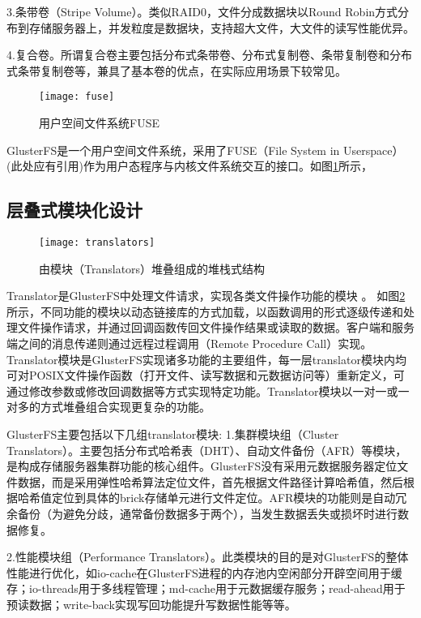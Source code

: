 3.条带卷（Stripe Volume）。类似RAID0，文件分成数据块以Round Robin方式分布到存储服务器上，并发粒度是数据块，支持超大文件，大文件的读写性能优异。

4.复合卷。所谓复合卷主要包括分布式条带卷、分布式复制卷、条带复制卷和分布式条带复制卷等，兼具了基本卷的优点，在实际应用场景下较常见。

\begin{figure}[htp]
\centering
\texttt{[image: fuse]}
\caption{用户空间文件系统FUSE}
\label{fig:fuse}
\end{figure}
GlusterFS是一个用户空间文件系统，采用了FUSE（File System in Userspace）{\color{red}(此处应有引用)}作为用户态程序与内核文件系统交互的接口。如图\ref{fig:fuse}所示，

\subsection{层叠式模块化设计}
\begin{figure}[htp]
\centering
\texttt{[image: translators]}
\caption{由模块（Translators）堆叠组成的堆栈式结构}
\label{fig:translators}
\end{figure}
Translator是GlusterFS中处理文件请求，实现各类文件操作功能的模块
\cite{BWFS}\cite{DPFS}。
如图\ref{fig:translators}所示，不同功能的模块以动态链接库的方式加载，以函数调用的形式逐级传递和处理文件操作请求，并通过回调函数传回文件操作结果或读取的数据。客户端和服务端之间的消息传递则通过远程过程调用（Remote Procedure Call）实现。
Translator模块是GlusterFS实现诸多功能的主要组件，每一层translator模块内均可对POSIX文件操作函数（打开文件、读写数据和元数据访问等）重新定义，可通过修改参数或修改回调数据等方式实现特定功能。Translator模块以一对一或一对多的方式堆叠组合实现更复杂的功能。

GlusterFS主要包括以下几组translator模块:
1.集群模块组（Cluster Translators）。主要包括分布式哈希表（DHT）、自动文件备份（AFR）等模块，是构成存储服务器集群功能的核心组件。GlusterFS没有采用元数据服务器定位文件数据，而是采用弹性哈希算法定位文件，首先根据文件路径计算哈希值，然后根据哈希值定位到具体的brick存储单元进行文件定位。AFR模块的功能则是自动冗余备份（为避免分歧，通常备份数据多于两个），当发生数据丢失或损坏时进行数据修复。

2.性能模块组（Performance Translators）。此类模块的目的是对GlusterFS的整体性能进行优化，如io-cache在GlusterFS进程的内存池内空闲部分开辟空间用于缓存；io-threads用于多线程管理；md-cache用于元数据缓存服务；read-ahead用于预读数据；write-back实现写回功能提升写数据性能等等。

